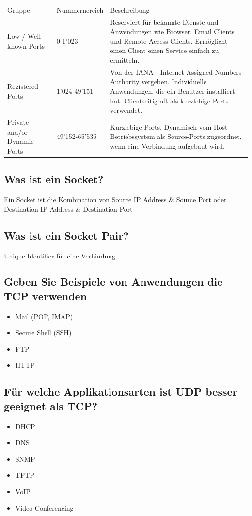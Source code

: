 \begin{tabularx}{\textwidth}{llX}
    Gruppe&Nummernereich&Beschreibung\\
    Low / Well-known Ports&0-1'023&Reserviert für bekannte Dienste und Anwendungen wie Browser, Email Clients und Remote Access Clients. Ermöglicht einen Client einen Service einfach zu ermitteln.\\
    Registered Ports&1'024-49'151&Von der IANA - Internet Assigned Numbers Authority vergeben. Individuelle Anwendungen, die ein Benutzer installiert hat. Clientseitig oft als kurzlebige Ports verwendet.\\
    Private and/or Dynamic Ports&49'152-65'535&Kurzlebige Ports. Dynamisch vom Host-Betriebssystem als Source-Ports zugeordnet, wenn eine Verbindung aufgebaut wird.\\
\end{tabularx}

\subsection*{Was ist ein Socket?}
Ein Socket ist die Kombination von Source IP Address \& Source Port oder Destination IP Address \& Destination Port

\subsection*{Was ist ein \flqq{}Socket Pair\frqq?}
Unique Identifier für eine Verbindung.

\subsection*{Geben Sie Beispiele von Anwendungen die TCP verwenden}
\begin{itemize}
    \item Mail (POP, IMAP)
    \item Secure Shell (SSH)
    \item FTP
    \item HTTP
\end{itemize}

\subsection*{Für welche Applikationsarten ist UDP besser geeignet als TCP?}
\begin{itemize}
    \item DHCP
    \item DNS
    \item SNMP
    \item TFTP
    \item VoIP
    \item Video Conferencing
\end{itemize}

